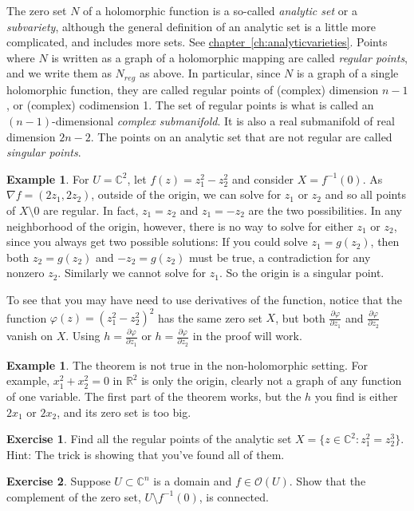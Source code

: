 \documentclass[12pt,openany]{book}
\newcommand{\C}{{\mathbb{C}}}
\newcommand{\R}{{\mathbb{R}}}
\newcommand{\sO}{{\mathscr{O}}}
\newcommand{\myindex}[1]{#1\index{#1}}
\theoremstyle{plain}
\theoremstyle{remark}
\theoremstyle{definition}
\newenvironment{exbox}{%
    \def\FrameCommand{\vrule width 1pt \relax\hspace {10pt}}%
    \MakeFramed {\advance \hsize -\width \FrameRestore }%
}{%
    \endMakeFramed
}
\theoremstyle{exercise}
\newtheorem{exercise}{Exercise}[section]
\theoremstyle{example}
\newtheorem{example}[thm]{Example}
\newcommand{\chapterref}[1]{\hyperref[#1]{chapter~\ref*{#1}}}
\begin{document}
The zero set $N$ of a holomorphic function is a so-called
\emph{\myindex{analytic set}} or a \emph{\myindex{subvariety}},
although the general definition of an
analytic set is a little more complicated, and includes more sets.
See \chapterref{ch:analyticvarieties}.
Points where $N$ is written as a graph of a holomorphic mapping are called
\emph{regular points}, and we write them as
$N_{\mathit{reg}}$ as above.  In particular,
since $N$ is a graph of a single holomorphic function, they are called
regular points of (complex) dimension $n-1$, or (complex) codimension 1.
The set of regular points is what is called an
$(n-1)$-dimensional \emph{\myindex{complex submanifold}}.  It is also a real
submanifold of real dimension $2n-2$.
The points on an analytic set that are not regular are called
\emph{singular points}.

\begin{example}
For $U = \C^2$,
let $f(z) = z_1^2-z_2^2$ and consider $X = f^{-1}(0)$. As $\nabla f =
(2z_1,2z_2)$,
outside of the origin, we can solve for $z_1$ or $z_2$ and so
all points of $X \setminus 0$ are regular.  In fact,
$z_1 = z_2$ and $z_1 = -z_2$ are the two possibilities.
In any neighborhood of the origin, however, there is no way to solve for either
$z_1$ or $z_2$, since you always get two possible solutions:  If you could
solve $z_1 = g(z_2)$, then both $z_2 = g(z_2)$ and $-z_2 = g(z_2)$ must be
true, a contradiction for any nonzero $z_2$.  Similarly we cannot solve for $z_1$.
So the origin is a singular point.

To see that you may have need to use derivatives of the function, notice
that the function $\varphi(z) = {(z_1^2-z_2^2)}^2$ has the same zero set $X$,
but both
$\frac{\partial \varphi}{\partial z_1}$ and
$\frac{\partial \varphi}{\partial z_2}$ vanish on $X$.  Using
$h= \frac{\partial \varphi}{\partial z_1}$ or
$h= \frac{\partial \varphi}{\partial z_2}$ in the proof will work.
\end{example}

\begin{example}
The theorem is not true in the non-holomorphic setting.  For example, $x_1^2
+  x_2^2 = 0$ in $\R^2$ is only the origin, clearly not a graph
of any function of one variable.  The first part of the theorem works, but
the $h$ you find is either $2x_1$ or $2x_2$, and its zero set is too big.
\end{example}

\pagebreak[1]
\begin{exbox}
\begin{exercise}
Find all the regular points of the analytic set
$X = \bigl\{ z \in \C^2 : z_1^2 = z_2^3 \bigr\}$.
Hint: The trick is showing that you've found all of them.
\end{exercise}

\begin{exercise} \label{exercise:connectedcomplement}
Suppose $U \subset \C^n$ is a domain and $f \in \sO(U)$.
Show that the complement of the zero set, $U \setminus f^{-1}(0)$, is
connected.
\end{exercise}
\end{exbox}
\end{document}
